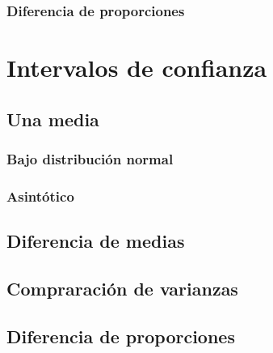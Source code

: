 \documentclass[
]{book}
\begin{document}
\hypertarget{diferencia-de-proporciones}{%
\subsection{Diferencia de proporciones}\label{diferencia-de-proporciones}}

\hypertarget{intervalos-de-confianza}{%
\chapter{Intervalos de confianza}\label{intervalos-de-confianza}}

\hypertarget{una-media-1}{%
\section{Una media}\label{una-media-1}}

\hypertarget{bajo-distribuciuxf3n-normal}{%
\subsection{Bajo distribución normal}\label{bajo-distribuciuxf3n-normal}}

\hypertarget{asintuxf3tico}{%
\subsection{Asintótico}\label{asintuxf3tico}}

\hypertarget{diferencia-de-medias-1}{%
\section{Diferencia de medias}\label{diferencia-de-medias-1}}

\hypertarget{compraraciuxf3n-de-varianzas}{%
\section{Compraración de varianzas}\label{compraraciuxf3n-de-varianzas}}

\hypertarget{diferencia-de-proporciones-1}{%
\section{Diferencia de proporciones}\label{diferencia-de-proporciones-1}}

  
\end{document}

